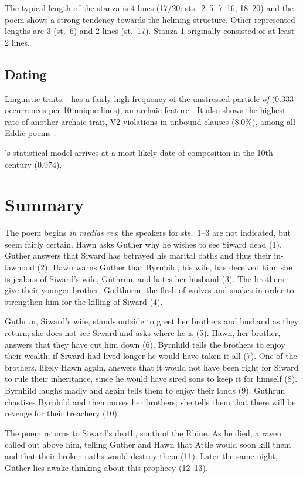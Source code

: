 The typical length of the stanza is 4 lines (17/20: sts.~2--5, 7--16, 18--20) and the poem shows a strong tendency towards the helming-structure.  Other represented lengths are 3 (st.~6) and 2 lines (st.~17).  Stanza 1 originally consisted of at least 2 lines.

\subsection{Dating}

Linguistic traits: \Brot\ has a fairly high frequency of the unstressed particle \emph{of} (0.333 occurrences per 10 unique lines), an archaic feature \parencite[70]{Sapp2022}.  It also shows the highest rate of another archaic trait, V2-violations in unbound clauses (8.0\%), among all Eddic poems \parencite[244, 255]{Haukur2012}.

\textcite[185]{Sapp2022}’s statistical model arrives at a most likely date of composition in the 10th century (0.974).

\section{Summary}

The poem begins \emph{in medias res}; the speakers for sts.~1--3 are not indicated, but seem fairly certain.  Hawn asks Guther why he wishes to see Siward dead (1).  Guther answers that Siward has betrayed his marital oaths and thus their in-lawhood (2).  Hawn warns Guther that Byrnhild, his wife, has deceived him; she is jealous of Siward’s wife, Guthrun, and hates her husband (3).  The brothers give their younger brother, Godthorm, the flesh of wolves and snakes in order to strengthen him for the killing of Siward (4).

Guthrun, Siward’s wife, stands outside to greet her brothers and husband as they return; she does not see Siward and asks where he is (5).  Hawn, her brother, answers that they have cut him down (6).  Byrnhild tells the brothers to enjoy their wealth; if Siward had lived longer he would have taken it all (7).  One of the brothers, likely Hawn again, answers that it would not have been right for Siward to rule their inheritance, since he would have sired sons to keep it for himself (8).  Byrnhild laughs madly and again tells them to enjoy their lands (9).  Guthrun chastises Byrnhild and then curses her brothers; she tells them that there will be revenge for their treachery (10).

The poem returns to Siward’s death, south of the Rhine.  As he died, a raven called out above him, telling Guther and Hawn that Attle would soon kill them and that their broken oaths would destroy them (11).  Later the same night, Guther lies awake thinking about this prophecy (12--13).

